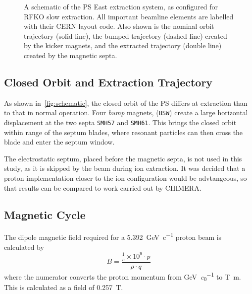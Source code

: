 \documentclass[11pt]{report}
\begin{document}
\begin{figure}
  \caption{A schematic of the PS East extraction system, as configured for RFKO slow extraction. All important beamline elements are labelled with their CERN layout code. Also shown is the nominal orbit trajectory (solid line), the bumped trajectory (dashed line) created by the kicker magnets, and the extracted trajectory (double line) created by the magnetic septa.}\label{fig:schematic}
\end{figure}

\subsection{Closed Orbit and Extraction Trajectory}

As shown in~\autoref{fig:schematic}, the closed orbit of the PS differs at extraction than to that in normal operation. Four \textit{bump} magnets, (\verb|BSW|) create a large horizontal displacement at the two septa \verb|SMH57| and \verb|SMH61|. This brings the closed orbit within range of the septum blades, where resonant particles can then cross the blade and enter the septum window.

The electrostatic septum, placed before the magnetic septa, is not used in this study, as it is skipped by the beam during ion extraction. It was decided that a proton implementation closer to the ion configuration would be advtangeous, so that results can be compared to work carried out by CHIMERA.

\subsection{Magnetic Cycle}

The dipole magnetic field required for a \qty[per-mode=symbol]{5.392}{\giga\electronvolt\per~c} proton beam is calculated by
\begin{equation}
  B=\frac{\frac 1c\times 10^9\cdot p}{\rho\cdot q}
\end{equation}
where the numerator converts the proton momentum from \si{\giga\electronvolt\per\clight} to \si{\tesla\meter}. This is calculated as a field of \qty{0.257}{\tesla}.
\end{document}
